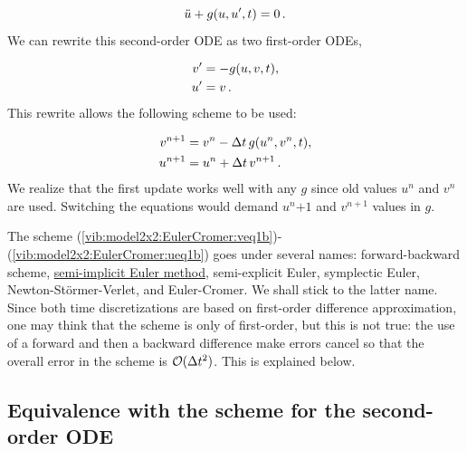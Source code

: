 \documentclass[%
oneside,                 %
final,                   %
10pt]{article}
\begin{document}
\[ \ddot u + g(u, u^{\prime}, t)=0\tp\]
We can rewrite this second-order ODE as two first-order ODEs,

\begin{align*}
v' &= -g(u,v,t),\\ 
u^{\prime} &= v\tp
\end{align*}
This rewrite allows the following scheme to be used:

\begin{align*}
v^{n+1} &= v^n -\Delta t\, g(u^n,v^n,t),\\ 
u^{n+1} &= u^n + \Delta t\, v^{n+1}\tp
\end{align*}
We realize that the first update works well with any $g$ since old
values $u^n$ and $v^n$ are used. Switching the equations would
demand $u^n{+1}$ and $v^{n+1}$ values in $g$.




The scheme
(\ref{vib:model2x2:EulerCromer:veq1b})-(\ref{vib:model2x2:EulerCromer:ueq1b})
goes under several names: forward-backward scheme, \href{{http://en.wikipedia.org/wiki/Semi-implicit_Euler_method}}{semi-implicit Euler method}, semi-explicit Euler,
symplectic Euler,
Newton-St\"{o}rmer-Verlet,
and Euler-Cromer.
We shall stick to the latter name.
Since both time discretizations are based on first-order difference
approximation, one may think that the scheme is only of first-order,
but this is not true: the use of a forward and then a backward
difference make errors cancel so that the overall error in the scheme
is $\Oof{\Delta t^2}$. This is explained below.

\subsection{Equivalence with the scheme for the second-order ODE}
\label{vib:model2x2:EulerCromer:equiv}
\end{document}
